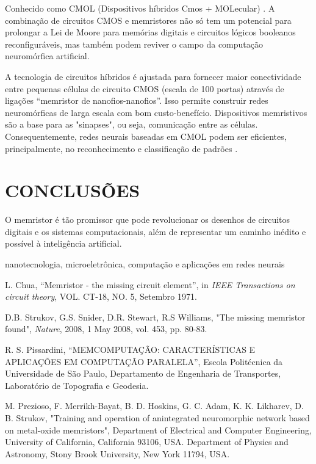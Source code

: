 \documentclass{ceel}
\begin{document}
\begin{multicols}{2}
Conhecido como CMOL (Dispositivos  híbridos Cmos + MOLecular) . A combinação de circuitos CMOS e memristores não só tem um potencial para prolongar a Lei de Moore para memórias digitais e circuitos lógicos booleanos reconfiguráveis, mas também podem reviver o campo da computação neuromórfica artificial.
 
A tecnologia de circuitos híbridos é ajustada para fornecer maior conectividade entre pequenas células de circuito CMOS (escala de 100 portas) através de ligações “memristor de nanofios-nanofios”. Isso permite construir redes neuromórficas de larga escala com bom custo-benefício. Dispositivos memristivos são a base para as "sinapses", ou seja, comunicação entre as células. Consequentemente, redes neurais baseadas em CMOL podem ser eficientes, principalmente, no reconhecimento e classificação de padrões \cite{oito}.


\section{CONCLUSÕES}
O memristor é tão promissor que pode revolucionar os desenhos de circuitos digitais e os sistemas computacionais, além de representar um caminho inédito e possível à inteligência artificial.

nanotecnologia, microeletrônica, computação e aplicações em redes neurais
\begin{thebibliography}{9}

    L. Chua,
    “Memristor - the missing circuit element”, 
    in \emph{IEEE Transactions on circuit theory}, VOL. CT-18, NO. 5, Setembro 1971.

     D.B. Strukov, G.S. Snider, D.R. Stewart,  R.S Williams, 
"The missing memristor found", 
\emph{Nature}, 2008, 1 May 2008, vol. 453, pp. 80-83.

    R. S. Pissardini,
    “MEMCOMPUTAÇÃO: CARACTERÍSTICAS E APLICAÇÕES EM
COMPUTAÇÃO PARALELA”, Escola Politécnica da Universidade de São Paulo, Departamento de Engenharia de Transportes, Laboratório de Topografia e Geodesia.
 
   M. Prezioso, F. Merrikh-Bayat, B. D. Hoskins, G. C. Adam, K. K. Likharev, D. B. Strukov, "Training and operation of anintegrated neuromorphic
network based on metal-oxide memristors", 
Department of Electrical and Computer Engineering, University of California, California 93106, USA. 
Department of Physics and Astronomy, Stony Brook University, New York 11794, USA. 


\end{thebibliography}
\end{multicols}
\end{document}
